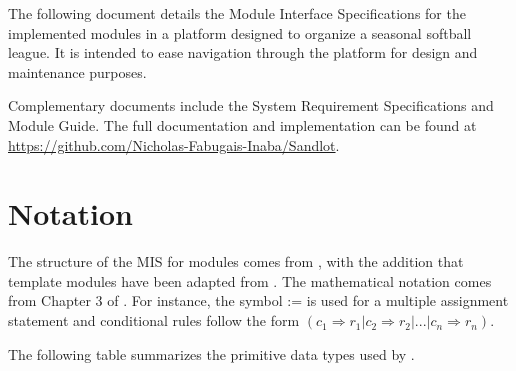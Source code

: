 \documentclass[12pt, titlepage]{article}
\begin{document}
The following document details the Module Interface Specifications for
the implemented modules in a platform designed to organize a seasonal
softball league. It is intended to ease navigation through the platform
for design and maintenance purposes.

Complementary documents include the System Requirement Specifications
and Module Guide.  The full documentation and implementation can be
found at \url{https://github.com/Nicholas-Fabugais-Inaba/Sandlot}.  

\section{Notation}

The structure of the MIS for modules comes from \citet{HoffmanAndStrooper1995},
with the addition that template modules have been adapted from
\cite{GhezziEtAl2003}.  The mathematical notation comes from Chapter 3 of
\citet{HoffmanAndStrooper1995}.  For instance, the symbol := is used for a
multiple assignment statement and conditional rules follow the form $(c_1
\Rightarrow r_1 | c_2 \Rightarrow r_2 | ... | c_n \Rightarrow r_n )$.

The following table summarizes the primitive data types used by \progname. 
\end{document}
